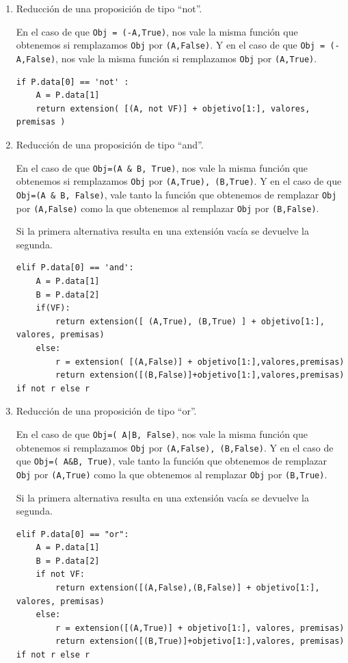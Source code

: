 \documentclass[10pt,a4paper]{report}
\begin{document}
\begin{enumerate}
\item Reducción de una proposición de tipo ``not''.
\label{sec:org2771e45}

En el caso de que \texttt{Obj = (-A,True)}, nos vale la misma función que obtenemos si remplazamos \texttt{Obj} por \texttt{(A,False)}.
Y en el caso de que \texttt{Obj = (-A,False)}, nos vale la misma función si remplazamos \texttt{Obj} por \texttt{(A,True)}.
\begin{verbatim}
if P.data[0] == 'not' :
    A = P.data[1]
    return extension( [(A, not VF)] + objetivo[1:], valores, premisas )
\end{verbatim}
\item Reducción de una proposición de tipo ``and''.
\label{sec:org3c7622f}

En el caso de que \texttt{Obj=(A \& B, True)}, nos vale la misma función que obtenemos si remplazamos \texttt{Obj} por \texttt{(A,True), (B,True)}.
Y en el caso de que \texttt{Obj=(A \& B, False)}, vale tanto la función que obtenemos de remplazar \texttt{Obj} por \texttt{(A,False)} como la que obtenemos al remplazar \texttt{Obj} por \texttt{(B,False)}.

Si la primera alternativa resulta en una extensión vacía se devuelve la segunda.
\begin{verbatim}
elif P.data[0] == 'and':
    A = P.data[1]
    B = P.data[2]
    if(VF):
        return extension([ (A,True), (B,True) ] + objetivo[1:], valores, premisas)
    else:
        r = extension( [(A,False)] + objetivo[1:],valores,premisas)
        return extension([(B,False)]+objetivo[1:],valores,premisas) if not r else r

\end{verbatim}
\item Reducción de una proposición de tipo ``or''.
\label{sec:org854e9da}

En el caso de que \texttt{Obj=( A|B, False)}, nos vale la misma función que obtenemos si remplazamos \texttt{Obj} por \texttt{(A,False), (B,False)}.
Y en el caso de que \texttt{Obj=( A\&B, True)}, vale tanto la función que obtenemos de remplazar \texttt{Obj} por \texttt{(A,True)} como la que obtenemos al remplazar \texttt{Obj} por \texttt{(B,True)}.

Si la primera alternativa resulta en una extensión vacía se devuelve la segunda.
\begin{verbatim}
elif P.data[0] == "or":
    A = P.data[1]
    B = P.data[2]
    if not VF:
        return extension([(A,False),(B,False)] + objetivo[1:], valores, premisas)
    else:
        r = extension([(A,True)] + objetivo[1:], valores, premisas)
        return extension([(B,True)]+objetivo[1:],valores, premisas) if not r else r


\end{verbatim}
\end{enumerate}
\end{document}
